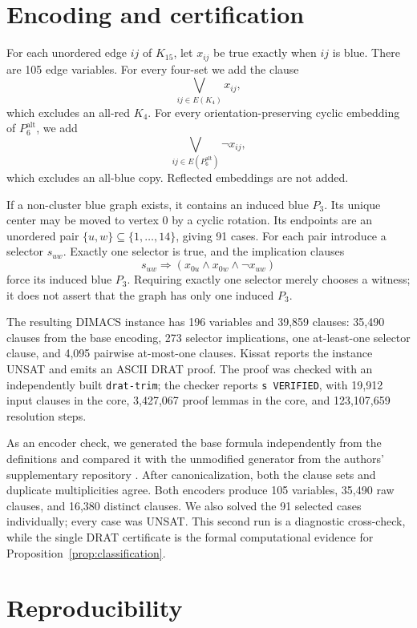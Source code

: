 \documentclass[11pt]{article}
\begin{document}
\section{Encoding and certification}\label{sec:certificate}

For each unordered edge $ij$ of $K_{15}$, let $x_{ij}$ be true exactly when
$ij$ is blue.  There are 105 edge variables.  For every four-set we add the
clause
\[
 \bigvee_{ij\in E(K_4)}x_{ij},
\]
which excludes an all-red $K_4$.  For every orientation-preserving cyclic
embedding of $P_6^{\mathrm{alt}}$, we add
\[
 \bigvee_{ij\in E(P_6^{\mathrm{alt}})}\neg x_{ij},
\]
which excludes an all-blue copy.  Reflected embeddings are not added.

If a non-cluster blue graph exists, it contains an induced blue $P_3$.  Its
unique center may be moved to vertex 0 by a cyclic rotation.  Its endpoints
are an unordered pair $\{u,w\}\subseteq\{1,\ldots,14\}$, giving 91 cases.
For each pair introduce a selector $s_{uw}$.  Exactly one selector is true,
and the implication clauses
\[
 s_{uw}\Longrightarrow
   (x_{0u}\wedge x_{0w}\wedge\neg x_{uw})
\]
force its induced blue $P_3$.  Requiring exactly one selector merely chooses
a witness; it does not assert that the graph has only one induced $P_3$.

The resulting DIMACS instance has 196 variables and 39,859 clauses: 35,490
clauses from the base encoding, 273 selector implications, one at-least-one
selector clause, and 4,095 pairwise at-most-one clauses.  Kissat reports the
instance UNSAT and emits an ASCII DRAT proof.  The proof was checked with an
independently built \texttt{drat-trim}; the checker reports \texttt{s VERIFIED},
with 19,912 input clauses in the core, 3,427,067 proof lemmas in the core, and
123,107,659 resolution steps.

As an encoder check, we generated the base formula independently from the
definitions and compared it with the unmodified generator from the authors'
supplementary repository \cite{ord-ram-num}.  After canonicalization, both the
clause sets and duplicate multiplicities agree.  Both encoders produce 105
variables, 35,490 raw clauses, and 16,380 distinct clauses.  We also solved the
91 selected cases individually; every case was UNSAT.  This second run is a
diagnostic cross-check, while the single DRAT certificate is the formal
computational evidence for Proposition~\ref{prop:classification}.

\section{Reproducibility}
\end{document}
